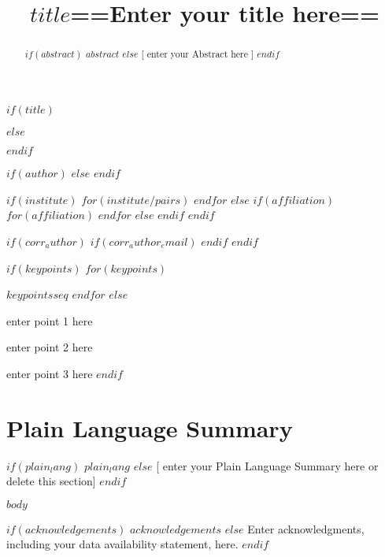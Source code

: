 \documentclass[draft]{agujournal2019}
\begin{document}
$if(title)$
\title{$title$}
$else$
\title{==Enter your title here==}
$endif$

$if(author)$
$else$
$endif$

$if(institute)$
$for(institute/pairs)$
$endfor$
$else$
$if(affiliation)$
$for(affiliation)$
$endfor$
$else$
$endif$
$endif$

$if(corr_author)$
$if(corr_author_email)$
$endif$
$endif$


\begin{keypoints}
$if(keypoints)$
$for(keypoints)$
\item $keypoints$$seq$
$endfor$
$else$
\item enter point 1 here
\item enter point 2 here
\item enter point 3 here
$endif$
\end{keypoints}



\begin{abstract}
$if(abstract)$
$abstract$
$else$
[ enter your Abstract here ]
$endif$
\end{abstract}

\section*{Plain Language Summary}
$if(plain_lang)$
$plain_lang$
$else$
[ enter your Plain Language Summary here or delete this section]
$endif$


$body$


\acknowledgments
$if(acknowledgements)$
$acknowledgements$
$else$
Enter acknowledgments, including your data availability statement, here.
$endif$




\end{document}
